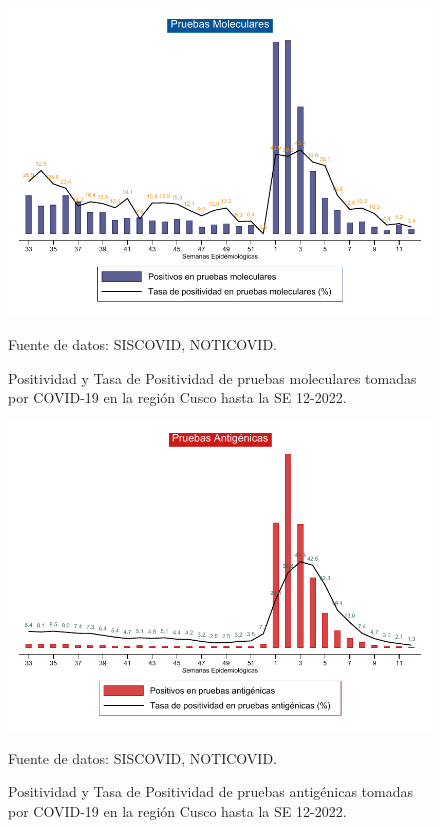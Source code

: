 \documentclass[12pt,a4paper,openany]{book}
\begin{document}
\begin{landscape}
	\begin{figure}[h]
		\caption{Positividad y Tasa de Positividad de pruebas moleculares tomadas por COVID-19 en la región Cusco hasta la SE 12-2022.}\label{fig:positividad_pcr}
		\begin{center}
			\includegraphics[width=0.90\linewidth]{../figuras/positividad_pcr.pdf}
		\end{center}
		{\footnotesize {Fuente de datos: SISCOVID, NOTICOVID.}}
	\end{figure}
\end{landscape}
\clearpage
\begin{landscape}

	\begin{figure}[h]
		\caption{ Positividad y Tasa de Positividad de pruebas antigénicas tomadas por COVID-19 en la región Cusco hasta la SE 12-2022.}\label{fig:positividad_ag}
		\begin{center}
			\includegraphics[width=0.90\linewidth]{../figuras/positividad_ag.pdf}
		\end{center}
		{\footnotesize {Fuente de datos: SISCOVID, NOTICOVID.}}
	\end{figure}
\end{landscape}
\clearpage
\end{document}
